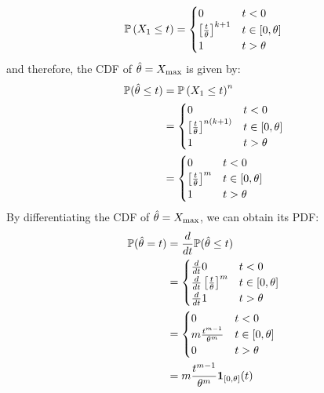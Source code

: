 \documentclass[12pt]{article}
\begin{document}
\begin{equation*}
    \P\left(X_{1} \leq t\right) =
    \begin{cases}
        0                                   & t < 0             \\
        \left[\frac{t}{\theta}\right]^{k+1} & t \in [0, \theta] \\
        1                                   & t > \theta
    \end{cases}
\end{equation*}
and therefore, the CDF of \(\thetahat = X_{\max}\) is given by:
\begin{align*}
    \P(\thetahat \leq t)
     & = \P\left(X_{1} \leq t\right)^n \\
     & =
    \begin{cases}
        0                                      & t < 0             \\
        \left[\frac{t}{\theta}\right]^{n(k+1)} & t \in [0, \theta] \\
        1                                      & t > \theta
    \end{cases}         \\
     & =
    \begin{cases}
        0                                 & t < 0             \\
        \left[\frac{t}{\theta}\right]^{m} & t \in [0, \theta] \\
        1                                 & t > \theta
    \end{cases}         \\
\end{align*}
By differentiating the CDF of \(\thetahat = X_{\max}\), we can obtain its PDF:
\begin{align*}
    \P(\thetahat = t)
     & =
    \frac{d}{dt} \P(\thetahat \leq t)              \\
     & =
    \begin{cases}
        \frac{d}{dt} 0                                 & t < 0             \\
        \frac{d}{dt} \left[\frac{t}{\theta}\right]^{m} & t \in [0, \theta] \\
        \frac{d}{dt} 1                                 & t > \theta
    \end{cases}                     \\
     & =
    \begin{cases}
        0                          & t < 0             \\
        m \frac{t^{m-1}}{\theta^m} & t \in [0, \theta] \\
        0                          & t > \theta
    \end{cases}                     \\
     & =
    m \frac{t^{m-1}}{\theta^m} \1_{[0, \theta]}(t) \\
\end{align*}
\end{document}
